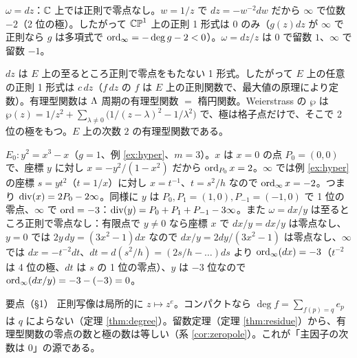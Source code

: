 \begin{ex}[$\CP^1$ 上]\label{ex:formsP1}
$\omega=dz$：$\mathbb C$ 上では正則で零点なし。$w=1/z$ で $dz=-w^{-2}dw$ だから $\infty$ で位数 $-2$（2 位の極）。したがって $\CP^1$ 上の正則 1 形式は $0$ のみ（$g(z)dz$ が $\infty$ で正則なら $g$ は多項式で $\operatorname{ord}_\infty=-\deg g-2<0$）。$\omega=dz/z$ は $0$ で留数 $1$、$\infty$ で留数 $-1$。
\end{ex}
\begin{ex}[$E=\C/\Lat$]
$dz$ は $E$ 上の至るところ正則で零点をもたない 1 形式。したがって $E$ 上の任意の正則 1 形式は $c\,dz$（$f\,dz$ の $f$ は $E$ 上の正則関数で、最大値の原理により定数）。有理型関数は $\Lambda$ 周期の有理型関数 $=$ 楕円関数。Weierstrass の $\wp$ は $\wp(z)=1/z^2+\sum_{\lambda\ne0}\bigl(1/(z-\lambda)^2-1/\lambda^2\bigr)$ で、極は格子点だけで、そこで 2 位の極をもつ。$E$ 上の次数 $2$ の有理型関数である。
\end{ex}
\begin{ex}[$y^2=x^3-x$ 上の有理型関数]\label{ex:ellfun}
$E_0:y^2=x^3-x$（$g=1$、例 \ref{ex:hyper}、$m=3$）。$x$ は $x=0$ の点 $P_0=(0,0)$ で、座標 $y$ に対し $x=-y^2/(1-x^2)$ だから $\operatorname{ord}_{P_0}x=2$。$\infty$ では例 \ref{ex:hyper} の座標 $s=y t^{2}$（$t=1/x$）に対し $x=t^{-1}$、$t=s^2/h$ なので $\operatorname{ord}_\infty x=-2$。つまり $\operatorname{div}(x)=2P_0-2\infty$。同様に $y$ は $P_0,P_1=(1,0),P_{-1}=(-1,0)$ で 1 位の零点、$\infty$ で $\operatorname{ord}=-3$：$\operatorname{div}(y)=P_0+P_1+P_{-1}-3\infty$。また $\omega=dx/y$ は至るところ正則で零点なし：有限点で $y\ne0$ なら座標 $x$ で $dx/y=dx/y$ は零点なし、$y=0$ では $2y\,dy=(3x^2-1)dx$ なので $dx/y=2dy/(3x^2-1)$ は零点なし、$\infty$ では $dx=-t^{-2}dt$、$dt=d(s^2/h)=(2s/h-\dots)ds$ より $\operatorname{ord}_\infty(dx)=-3$（$t^{-2}$ は 4 位の極、$dt$ は $s$ の 1 位の零点）、$y$ は $-3$ 位なので $\operatorname{ord}_\infty(dx/y)=-3-(-3)=0$。
\end{ex}

\begin{keybox}{要点（§1）}
正則写像は局所的に $z\mapsto z^e$。コンパクトなら $\deg f=\sum_{f(p)=q}e_p$ は $q$ によらない（定理 \ref{thm:degree}）。留数定理（定理 \ref{thm:residue}）から、有理型関数の零点の数と極の数は等しい（系 \ref{cor:zeropole}）。これが「主因子の次数は $0$」の源である。
\end{keybox}

